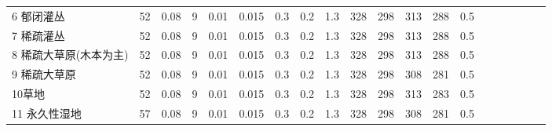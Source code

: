 \begin{landscape}
\begin{table}[htbp]
\begin{tabular}{@{}lccccccccccccccccccc@{}}
        6 郁闭灌丛        & 52          & 0.08          & 9          & 0.01          & 0.015          & 0.3          & 0.2          & 1.3          & 328          & 298          & 313          & 288          & 0.5          \\
        7 稀疏灌丛        & 52          & 0.08          & 9          & 0.01          & 0.015          & 0.3          & 0.2          & 1.3          & 328          & 298          & 313          & 288          & 0.5          \\
        8 稀疏大草原(木本为主) & 52          & 0.08          & 9          & 0.01          & 0.015          & 0.3          & 0.2          & 1.3          & 328          & 298          & 313          & 288          & 0.5          \\
        9 稀疏大草原       & 52          & 0.08          & 9          & 0.01          & 0.015          & 0.3          & 0.2          & 1.3          & 328          & 298          & 308          & 281          & 0.5          \\
        10草地          & 52          & 0.08          & 9          & 0.01          & 0.015          & 0.3          & 0.2          & 1.3          & 328          & 298          & 313          & 283          & 0.5          \\
        11 永久性湿地      & 57          & 0.08          & 9          & 0.01          & 0.015          & 0.3          & 0.2          & 1.3          & 328          & 298          & 308          & 281          & 0.5        \\ %
%    

\end{tabular}
\end{table}
\end{landscape}
